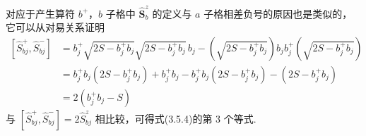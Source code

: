 对应于产生算符 $b^{+}$，$b$ 子格中 $\hat{\boldsymbol{S}}_b^{z}$
的定义与 $a$
子格相差负号的原因也是类似的，它可以从对易关系证明
\begin{equation*}
\begin{aligned}
  \left[\hat{S}_{bj}^{+},\hat{S}_{bj}^{-}\right]&=b_j^{+}\sqrt{2S-b_j^{+}b_j}\sqrt{2S-b_j^{+}b_j}\,b_j
  -\left(\sqrt{2S-b_j^{+}b_j}\right)b_jb_j^{+}\left(\sqrt{2S-b_j^{+}b_j}\right)\\
  &=b_j^{+}b_j\left(2S-b_j^{+}b_j\right)+b_j^{+}b_j
  -b_j^{+}b_j\left(2S-b_j^{+}b_j\right)-\left(2S-b_j^{+}b_j\right)\\
  &=2\left(b_j^{+}b_j-S\right)
\end{aligned}
\end{equation*}
与 $\left[\hat{S}_{bj}^{+},\hat{S}_{bj}^{-}\right]=2\hat{S}_{bj}^{z}$
相比较，可得式(3.5.4)的第 3 个等式.

